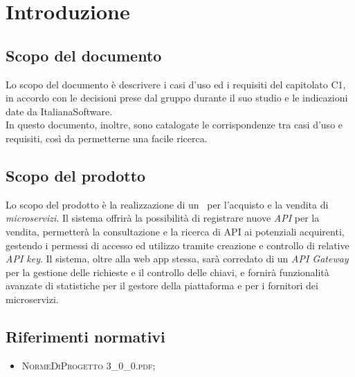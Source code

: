 \newpage
\section{Introduzione}

\subsection{Scopo del documento}
Lo scopo del documento è descrivere i casi d'uso ed i requisiti del capitolato C1, in accordo con le decisioni prese dal gruppo durante il suo studio e le indicazioni date da ItalianaSoftware.\\
In questo documento, inoltre, sono catalogate le corrispondenze tra casi d'uso e requisiti, così da permetterne una facile ricerca.

\subsection{Scopo del prodotto}
Lo scopo del prodotto è la realizzazione di un \progetto\ per l'acquisto e la vendita di \textit{microservizi}. Il sistema offrirà la possibilità di registrare nuove \textit{API} per la vendita, permetterà la consultazione e la ricerca di API ai potenziali acquirenti, gestendo i permessi di accesso ed utilizzo tramite creazione e controllo di relative \textit{API key}. Il sistema, oltre alla web app stessa, sarà corredato di un \textit{API Gateway} per la gestione delle richieste e il controllo delle chiavi, e fornirà funzionalità avanzate di statistiche per il gestore della piattaforma e per i fornitori dei microservizi.

\subsection{Riferimenti normativi}
\begin{itemize}
	\item \textsc{NormeDiProgetto 3\_0\_0.pdf};
\end{itemize}


